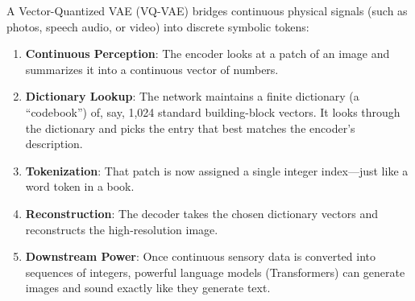 \documentclass[11pt,a4paper]{article}
\theoremstyle{definition}
\begin{document}
A Vector-Quantized VAE (VQ-VAE) bridges continuous physical signals (such as photos, speech audio, or video) into discrete symbolic tokens:
\begin{enumerate}
    \item \textbf{Continuous Perception}: The encoder looks at a patch of an image and summarizes it into a continuous vector of numbers.
    \item \textbf{Dictionary Lookup}: The network maintains a finite dictionary (a ``codebook'') of, say, 1,024 standard building-block vectors. It looks through the dictionary and picks the entry that best matches the encoder's description.
    \item \textbf{Tokenization}: That patch is now assigned a single integer index—just like a word token in a book.
    \item \textbf{Reconstruction}: The decoder takes the chosen dictionary vectors and reconstructs the high-resolution image.
    \item \textbf{Downstream Power}: Once continuous sensory data is converted into sequences of integers, powerful language models (Transformers) can generate images and sound exactly like they generate text.
\end{enumerate}
\end{document}

